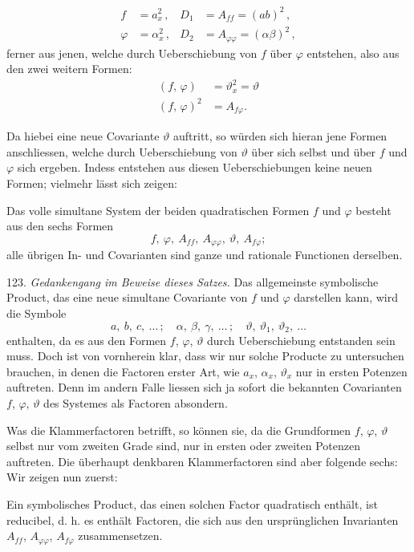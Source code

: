 \[
\begin{aligned}
f &= a_x^2\,, & D_1 &= A_{ff} = (ab)^2\,, \\
\varphi &= \alpha_x^2\,, & D_2 &= A_{\varphi\varphi} = (\alpha\beta)^2\,,
\end{aligned}
\]
ferner aus jenen, welche durch Ueberschiebung von $f$ über $\varphi$ entstehen, also aus den zwei weitern Formen:
\[
\begin{aligned}
(f,\,\varphi) &= \vartheta_x^2 = \vartheta \\
(f,\,\varphi)^2 &= A_{f\varphi}.
\end{aligned}
\]

Da hiebei eine neue Covariante $\vartheta$ auftritt, so würden sich hieran jene Formen anschliessen, welche durch Ueberschiebung von $\vartheta$ über sich selbst und über $f$ und $\varphi$ sich ergeben. Indess entstehen aus diesen Ueberschiebungen keine neuen Formen; vielmehr lässt sich zeigen:

\glqq Das volle simultane System der beiden quadratischen Formen $f$ und $\varphi$ besteht aus den sechs Formen
\[
f,\ \varphi,\ A_{ff},\ A_{\varphi\varphi},\ \vartheta,\ A_{f\varphi};
\]
alle übrigen In- und Covarianten sind ganze und rationale Functionen derselben.\grqq{}

123. \textit{Gedankengang im Beweise dieses Satzes.} Das allgemeinste symbolische Product, das eine neue simultane Covariante von $f$ und $\varphi$ darstellen kann, wird die Symbole
\[
a,\ b,\ c,\ \ldots\,;\quad \alpha,\ \beta,\ \gamma,\ \ldots\,;\quad \vartheta,\ \vartheta_1,\ \vartheta_2,\ \ldots
\]
enthalten, da es aus den Formen $f$, $\varphi$, $\vartheta$ durch Ueberschiebung entstanden sein muss. Doch ist von vornherein klar, dass wir nur solche Producte zu untersuchen brauchen, in denen die Factoren erster Art, wie $a_x$, $\alpha_x$, $\vartheta_x$ nur in ersten Potenzen auftreten. Denn im andern Falle liessen sich ja sofort die bekannten Covarianten $f$, $\varphi$, $\vartheta$ des Systemes als Factoren absondern.

Was die Klammerfactoren betrifft, so können sie, da die Grundformen $f$, $\varphi$, $\vartheta$ selbst nur vom zweiten Grade sind, nur in ersten oder zweiten Potenzen auftreten. Die überhaupt denkbaren Klammerfactoren sind aber folgende sechs:
Wir zeigen nun zuerst:

\glqq Ein symbolisches Product, das einen solchen Factor quadratisch enthält, ist reducibel, d. h. es enthält Factoren, die sich aus den ursprünglichen Invarianten $A_{ff}$, $A_{\varphi\varphi}$, $A_{f\varphi}$ zusammensetzen.\grqq{}

